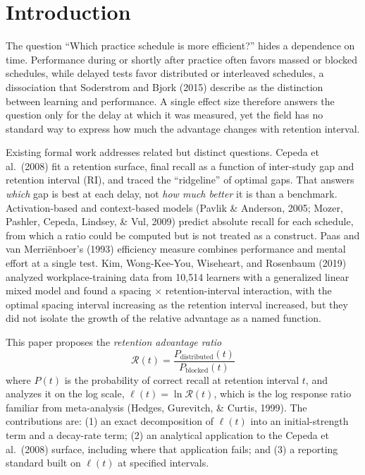\documentclass[10pt,twocolumn]{article}
\newcommand{\effr}{\mathcal{R}}
\newcommand{\lr}{\ell}
\begin{document}
\section{Introduction}

The question ``Which practice schedule is more efficient?'' hides a dependence on time. Performance during or shortly after practice often favors massed or blocked schedules, while delayed tests favor distributed or interleaved schedules, a dissociation that Soderstrom and Bjork (2015) describe as the distinction between learning and performance. A single effect size therefore answers the question only for the delay at which it was measured, yet the field has no standard way to express how much the advantage changes with retention interval.

Existing formal work addresses related but distinct questions. Cepeda et al.\ (2008) fit a retention surface, final recall as a function of inter-study gap and retention interval (RI), and traced the ``ridgeline'' of optimal gaps. That answers \textit{which} gap is best at each delay, not \textit{how much better} it is than a benchmark. Activation-based and context-based models (Pavlik \& Anderson, 2005; Mozer, Pashler, Cepeda, Lindsey, \& Vul, 2009) predict absolute recall for each schedule, from which a ratio could be computed but is not treated as a construct. Paas and van Merri\"{e}nboer's (1993) efficiency measure combines performance and mental effort at a single test. Kim, Wong-Kee-You, Wiseheart, and Rosenbaum (2019) analyzed workplace-training data from 10,514 learners with a generalized linear mixed model and found a spacing $\times$ retention-interval interaction, with the optimal spacing interval increasing as the retention interval increased, but they did not isolate the growth of the relative advantage as a named function.

This paper proposes the \textit{retention advantage ratio}
\begin{equation}
\effr(t) = \frac{P_{\text{distributed}}(t)}{P_{\text{blocked}}(t)}
\label{eq:advantage}
\end{equation}
where $P(t)$ is the probability of correct recall at retention interval $t$, and analyzes it on the log scale, $\lr(t) = \ln \effr(t)$, which is the log response ratio familiar from meta-analysis (Hedges, Gurevitch, \& Curtis, 1999). The contributions are: (1) an exact decomposition of $\lr(t)$ into an initial-strength term and a decay-rate term; (2) an analytical application to the Cepeda et al.\ (2008) surface, including where that application fails; and (3) a reporting standard built on $\lr(t)$ at specified intervals.
\end{document}
